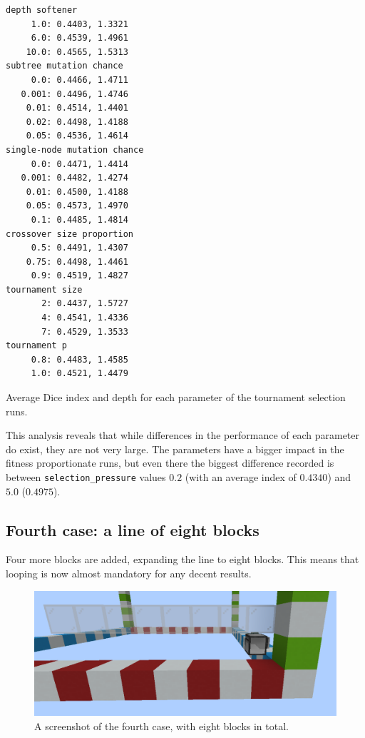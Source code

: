 \documentclass{report}
\newenvironment{code}{\captionsetup{type=listing}}{}
\begin{document}
\begin{code}
    \begin{verbatim}
depth softener
     1.0: 0.4403, 1.3321
     6.0: 0.4539, 1.4961
    10.0: 0.4565, 1.5313
subtree mutation chance
     0.0: 0.4466, 1.4711
   0.001: 0.4496, 1.4746
    0.01: 0.4514, 1.4401
    0.02: 0.4498, 1.4188
    0.05: 0.4536, 1.4614
single-node mutation chance
     0.0: 0.4471, 1.4414
   0.001: 0.4482, 1.4274
    0.01: 0.4500, 1.4188
    0.05: 0.4573, 1.4970
     0.1: 0.4485, 1.4814
crossover size proportion
     0.5: 0.4491, 1.4307
    0.75: 0.4498, 1.4461
     0.9: 0.4519, 1.4827
tournament size
       2: 0.4437, 1.5727
       4: 0.4541, 1.4336
       7: 0.4529, 1.3533
tournament p
     0.8: 0.4483, 1.4585
     1.0: 0.4521, 1.4479
    \end{verbatim}
    \caption{Average Dice index and depth for each parameter of the tournament selection runs.}
    \label{lst:case3_tour}
\end{code}

This analysis reveals that while differences in the performance of each parameter do exist, they are not very large. The parameters have a bigger impact in the fitness proportionate runs, but even there the biggest difference recorded is between \verb|selection_pressure| values $0.2$ (with an average index of $0.4340$) and $5.0$ ($0.4975$).

\subsection{Fourth case: a line of eight blocks}

Four more blocks are added, expanding the line to eight blocks. This means that looping is now almost mandatory for any decent results.

\begin{figure}[H]
    \centering
    \includegraphics[scale=0.3]{minecraft5}
    \caption{A screenshot of the fourth case, with eight blocks in total.}
\end{figure}
\end{document}
